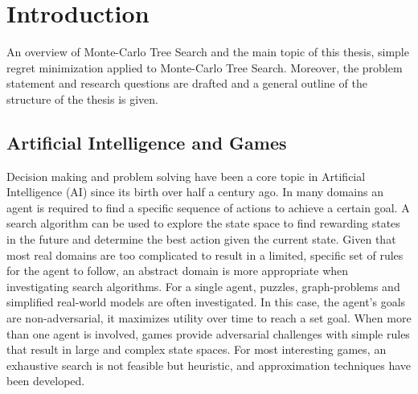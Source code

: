 \documentclass{kecsmstr}
\begin{document}
\tableofcontents  \emptypage 
\listofalgorithms \emptypage
{}

\chapter{Introduction}

\begin{chaptercontents} An overview of Monte-Carlo Tree Search and the main topic of this thesis, simple regret minimization applied to Monte-Carlo Tree Search. Moreover, the problem statement and research questions are drafted and a general outline of the structure of the thesis is given.
\end{chaptercontents}

\section{Artificial Intelligence and Games}
Decision making and problem solving have been a core topic in Artificial Intelligence (AI) since its birth over half a century ago. In many domains an agent is required to find a specific sequence of actions to achieve a certain goal. A search algorithm can be used to explore the state space to find rewarding states in the future and determine the best action given the current state.
Given that most real domains are too complicated to result in a limited, specific set of rules for the agent to follow, an abstract domain is more appropriate when investigating search algorithms. For a single agent, puzzles, graph-problems and simplified real-world models are often investigated. In this case, the agent's goals are non-adversarial, it maximizes utility over time to reach a set goal. When more than one agent is involved, games provide adversarial challenges with simple rules that result in large and complex state spaces. For most interesting games, an exhaustive search is not feasible but heuristic, and approximation techniques have been developed.
\end{document}
